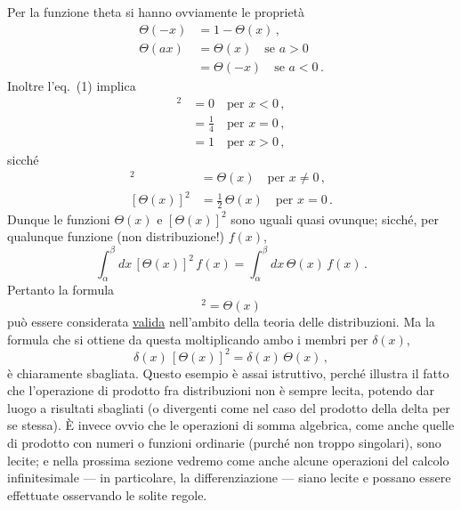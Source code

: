 \documentclass[11pt, a4paper]{book}
\numberwithin{equation}{section}
\begin{document}
Per la funzione theta si hanno ovviamente le proprietà
\begin{align}
\Theta(-x) &= 1 - \Theta(x) \,, \tag{17} \\
\Theta(ax) &= \Theta(x) \quad \text{se } a > 0 \nonumber \\
&= \Theta(-x) \quad \text{se } a < 0 \,. \tag{18}
\end{align}
Inoltre l'eq.~(1) implica
\begin{align}
[\Theta(x)]^2 &= 0 \quad \text{per } x < 0 \,, \tag{19a} \\
&= \frac{1}{4} \quad \text{per } x = 0 \,, \tag{19b} \\
&= 1 \quad \text{per } x > 0 \,, \tag{19c}
\end{align}
sicché
\begin{align}
[\Theta(x)]^2 &= \Theta(x) \quad \text{per } x \neq 0 \,, \tag{20a} \\
[\Theta(x)]^2 &= \frac{1}{2}\,\Theta(x) \quad \text{per } x = 0 \,. \tag{20b}
\end{align}
Dunque le funzioni $\Theta(x)$ e $[\Theta(x)]^2$ sono uguali quasi ovunque; sicché, per qualunque funzione (non distribuzione!) $f(x)$,
\begin{equation}
\int_{\alpha}^{\beta} dx\, [\Theta(x)]^2\, f(x) = \int_{\alpha}^{\beta} dx\, \Theta(x)\, f(x) \,. \tag{21}
\end{equation}
Pertanto la formula
\begin{equation}
[\Theta(x)]^2 = \Theta(x) \tag{22}
\end{equation}
può essere considerata \underline{valida} nell'ambito della teoria delle distribuzioni. Ma la formula che si ottiene da questa moltiplicando ambo i membri per $\delta(x)$,
\[
\delta(x)\,[\Theta(x)]^2 = \delta(x)\,\Theta(x) \,,
\]
è chiaramente sbagliata. Questo esempio è assai istruttivo, perché illustra il fatto che l'operazione di prodotto fra distribuzioni non è sempre lecita, potendo dar luogo a risultati sbagliati (o divergenti come nel caso del prodotto della delta per se stessa). È invece ovvio che le operazioni di somma algebrica, come anche quelle di prodotto con numeri o funzioni ordinarie (purché non troppo singolari), sono lecite; e nella prossima sezione vedremo come anche alcune operazioni del calcolo infinitesimale --- in particolare, la differenziazione --- siano lecite e possano essere effettuate osservando le solite regole.
\end{document}
